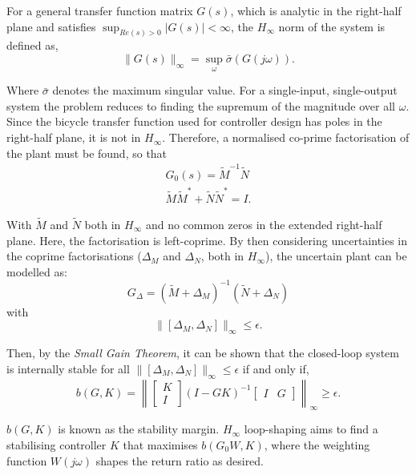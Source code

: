 For a general transfer function matrix $G(s)$, which is analytic in the right-half plane and satisfies $\sup_{Re(s) > 0}{|G(s)|}<\infty$, the $H_{\infty}$ norm of the system is defined as,
\begin{equation*}
\lVert G(s) \rVert_{\infty} = \sup_{\omega}{\bar{\sigma}(G(j\omega))}.
\end{equation*}

Where $\bar{\sigma}$ denotes the maximum singular value. For a single-input, single-output system the problem reduces to finding the supremum of the magnitude over all $\omega$. \\

Since the bicycle transfer function used for controller design has poles in the right-half plane, it is not in $H_{\infty}$. Therefore, a normalised co-prime factorisation of the plant must be found, so that
\begin{align*}
G_0(s) = \tilde{M}^{-1} \tilde{N} \\
\tilde{M} \tilde{M}^* + \tilde{N} \tilde{N}^* = I.
\end{align*}

With $\tilde{M}$ and $\tilde{N}$ both in $H_{\infty}$ and no common zeros in the extended right-half plane. Here, the factorisation is left-coprime. By then considering uncertainties in the coprime factorisations ($\Delta_M$ and $\Delta_N$, both in $H_{\infty}$), the uncertain plant can be modelled as:
\begin{equation*}
G_{\Delta} = (\tilde{M} + \Delta_M)^{-1} (\tilde{N} + \Delta_N)
\end{equation*}
with
\begin{equation*}
\lVert [\Delta_M, \Delta_N] \rVert_{\infty} \leq \epsilon.
\end{equation*}

Then, by the \textit{Small Gain Theorem}, it can be shown that the closed-loop system is internally stable for all $\lVert [\Delta_M, \Delta_N] \rVert_{\infty} \leq \epsilon$ if and only if,
\begin{equation*}
b(G,K) = \left \lVert \begin{bmatrix}
K \\
I
\end{bmatrix} (I - G K)^{-1} \begin{bmatrix}
I & G
\end{bmatrix} \right \rVert_{\infty} \geq \epsilon.
\end{equation*}

$b(G,K)$ is known as the stability margin. $H_{\infty}$ loop-shaping aims to find a stabilising controller $K$ that maximises $b(G_0 W,K)$, where the weighting function $W(j\omega)$ shapes the return ratio as desired. \\

